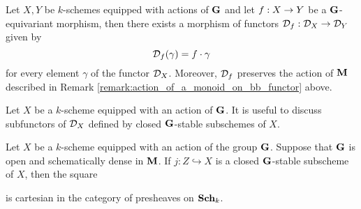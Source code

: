 \begin{remark}\label{remark:functoriality_of_bb_functor}
Let $X,Y$ be $k$-schemes equipped with actions of $\mathbf{G}$ and let $f:X\rightarrow Y$ be a $\mathbf{G}$-equivariant morphism, then there exists a morphism of functors ${\mathcal D}_f:{\mathcal D}_X\rightarrow {\mathcal D}_Y$ given by
$${\mathcal D}_f(\gamma) = f\cdot \gamma$$
for every element $\gamma$ of the functor ${\mathcal D}_X$. Moreover, ${\mathcal D}_f$ preserves the action of $\mathbf{M}$ described in Remark \ref{remark:action_of_a_monoid_on_bb_functor} above.
\end{remark}
\noindent
Let $X$ be a $k$-scheme equipped with an action of $\mathbf{G}$. It is useful to discuss subfunctors of ${\mathcal D}_X$ defined by closed $\mathbf{G}$-stable subschemes of $X$.

\begin{theorem}\label{theorem:closed_subfunctors_induced_by_closed_stable_subschemes}
Let $X$ be a $k$-scheme equipped with an action of the group $\mathbf{G}$. Suppose that $\mathbf{G}$ is open and schematically dense in $\mathbf{M}$. If $j:Z\hookrightarrow X$ is a closed $\mathbf{G}$-stable subscheme of $X$, then the square
\begin{center}
\end{center}
is cartesian in the category of presheaves on $\mathbf{Sch}_k$.
\end{theorem}
